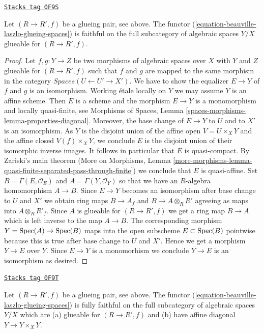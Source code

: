 \begin{lemma}[Glueing f]
\label{spaces-pushouts-lemma-glueing-f}
\href{https://stacks.math.columbia.edu/tag/0F9S}{\texttt{Stacks tag 0F9S}}

Let $(R \to R', f)$ be a glueing pair, see above.
The functor (\ref{equation-beauville-laszlo-glueing-spaces})
is faithful on the full subcategory of
algebraic spaces $Y/X$ glueable for $(R \to R', f)$.
\end{lemma}

\begin{proof}
Let $f, g : Y \to Z$ be two morphisms of algebraic spaces over $X$
with $Y$ and $Z$ glueable for $(R \to R', f)$ such that $f$ and $g$ are mapped
to the same morphism in the category $\textit{Spaces}(U \leftarrow U' \to X')$.
We have to show the equalizer $E \to Y$ of $f$ and $g$ is an isomorphism.
Working \'etale locally on $Y$ we may assume $Y$ is an affine scheme.
Then $E$ is a scheme and the morphism $E \to Y$ is a monomorphism
and locally quasi-finite, see Morphisms of Spaces, Lemma
\ref{spaces-morphisms-lemma-properties-diagonal}.
Moreover, the base change of $E \to Y$ to $U$ and to $X'$ is
an isomorphism. As $Y$ is the disjoint union of the affine open
$V = U \times_X Y$ and the affine closed $V(f) \times_X Y$, we conclude
$E$ is the disjoint union of their isomorphic inverse images.
It follows in particular that $E$ is quasi-compact.
By Zariski's main theorem (More on Morphisms, Lemma
\ref{more-morphisms-lemma-quasi-finite-separated-pass-through-finite})
we conclude that $E$ is quasi-affine.
Set $B = \Gamma(E, \mathcal{O}_E)$ and $A = \Gamma(Y, \mathcal{O}_Y)$
so that we have an $R$-algebra homomorphism $A \to B$.
Since $E \to Y$ becomes an isomorphism after base change to $U$ and $X'$
we obtain ring maps $B \to A_f$ and $B \to A \otimes_R R'$
agreeing as maps into $A \otimes_R R'_f$. Since $A$ is glueable
for $(R \to R', f)$ we get a ring map $B \to A$ which is left inverse
to the map $A \to B$. The corresponding morphism $Y = \operatorname{Spec}(A) \to \operatorname{Spec}(B)$
maps into the open subscheme $E \subset \operatorname{Spec}(B)$ pointwise because
this is true after base change to $U$ and $X'$. Hence we get a morphism
$Y \to E$ over $Y$. Since $E \to Y$ is a monomorhism we conclude
$Y \to E$ is an isomorphism as desired.
\end{proof}

\begin{lemma}[Glueing ff]
\label{spaces-pushouts-lemma-glueing-ff}
\href{https://stacks.math.columbia.edu/tag/0F9T}{\texttt{Stacks tag 0F9T}}

Let $(R \to R', f)$ be a glueing pair, see above.
The functor (\ref{equation-beauville-laszlo-glueing-spaces})
is fully faithful on the full subcategory of
algebraic spaces $Y/X$ which are (a) glueable for $(R \to R', f)$
and (b) have affine diagonal $Y \to Y \times_X Y$.
\end{lemma}

